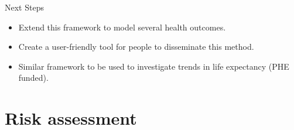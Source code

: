 \documentclass[slidestop,compress,serif,10pt]{beamer}
\begin{document}
%
%
%
\begin{frame}{Next Steps}
\begin{itemize}
\vfill\item Extend this framework to model several health outcomes.
\vfill\item  Create a user-friendly tool for people to disseminate this method.
\vfill\item Similar framework to be used to investigate trends in life expectancy (PHE funded).
\end{itemize}

\vspace{20pt}


\fontsize{7}{7}

\end{frame}


\section{Risk assessment}
\begin{frame}
\begin{center}
\vfill\fontsize{20}{20}\selectfont{Risk Assessment}\end{center}
\end{frame}
\end{document}
